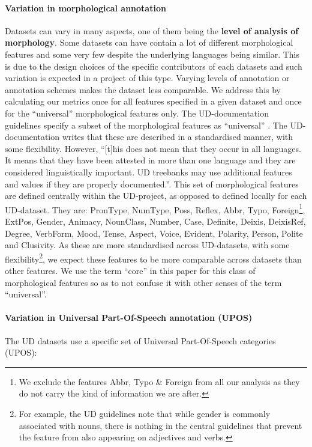 \documentclass[USenglish]{article}
\begin{document}
\paragraph{Variation in morphological annotation}
Datasets can vary in many aspects, one of them being the \textbf{level of analysis of morphology}. 
Some datasets can have contain a lot of different morphological features and some very few despite the underlying languages being similar. 
This is due to the design choices of the specific contributors of each datasets and such variation is expected in a project of this type.
Varying levels of annotation or annotation schemes makes the dataset less comparable.
We address this by calculating our metrics once for all features specified in a given dataset and once for the ``universal'' morphological features only. The UD-documentation guidelines specify a subset of the morphological features as ``universal'' \citep{ud_2_feat_website}. The UD-documentation writes that these are described in a standardised manner, with some flexibility. However, ``[t]his does not mean that they occur in all languages. It means that they have been attested in more than one language and they are considered linguistically important. UD treebanks may use additional features and values if they are properly documented.''. This set of morphological features are defined centrally within the UD-project, as opposed to defined locally for each UD-dataset. They are: PronType, NumType, Poss, Reflex, Abbr, Typo, Foreign\footnote{We exclude the features Abbr, Typo \& Foreign from all our analysis as they do not carry the kind of information we are after.}, ExtPos, Gender, Animacy, NounClass, Number, Case, Definite, Deixis, DeixisRef, Degree, VerbForm, Mood, Tense, Aspect, Voice, Evident, Polarity, Person, Polite and Clusivity.
As these are more standardised across UD-datasets, with some flexibility\footnote{For example, the UD guidelines note that while gender is commonly associated with nouns, there is nothing in the central guidelines that prevent the feature from also appearing on adjectives and verbs.}, we expect these features to be more comparable across datasets than other features. 
We use the term ``core'' in this paper for this class of morphological features so as to not confuse it with other senses of the term ``universal''.

\paragraph{Variation in Universal Part-Of-Speech annotation (UPOS)}
The UD datasets use a specific set of Universal Part-Of-Speech categories (UPOS):
\end{document}
